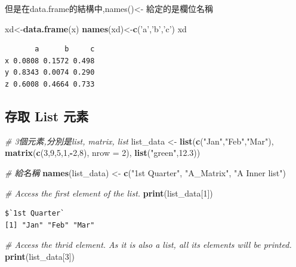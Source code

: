 \documentclass[]{book}
\newenvironment{Shaded}{\begin{snugshade}}{\end{snugshade}}
\newcommand{\CommentTok}[1]{\textcolor[rgb]{0.56,0.35,0.01}{\textit{#1}}}
\newcommand{\DataTypeTok}[1]{\textcolor[rgb]{0.13,0.29,0.53}{#1}}
\newcommand{\DecValTok}[1]{\textcolor[rgb]{0.00,0.00,0.81}{#1}}
\newcommand{\FloatTok}[1]{\textcolor[rgb]{0.00,0.00,0.81}{#1}}
\newcommand{\KeywordTok}[1]{\textcolor[rgb]{0.13,0.29,0.53}{\textbf{#1}}}
\newcommand{\NormalTok}[1]{#1}
\newcommand{\OperatorTok}[1]{\textcolor[rgb]{0.81,0.36,0.00}{\textbf{#1}}}
\newcommand{\StringTok}[1]{\textcolor[rgb]{0.31,0.60,0.02}{#1}}
\theoremstyle{definition}
\theoremstyle{definition}
\theoremstyle{definition}
\theoremstyle{remark}
\begin{document}
但是在data.frame的結構中,names()\textless{}- 給定的是欄位名稱

\begin{Shaded}
\begin{Highlighting}[]
\NormalTok{xd<-}\KeywordTok{data.frame}\NormalTok{(x)}
\KeywordTok{names}\NormalTok{(xd)<-}\KeywordTok{c}\NormalTok{(}\StringTok{'a'}\NormalTok{,}\StringTok{'b'}\NormalTok{,}\StringTok{'c'}\NormalTok{)}
\NormalTok{xd}
\end{Highlighting}
\end{Shaded}

\begin{verbatim}
       a      b     c
x 0.0808 0.1572 0.498
y 0.8343 0.0074 0.290
z 0.6008 0.4664 0.733
\end{verbatim}

\hypertarget{-list-}{%
\subsection{存取 List 元素}\label{-list-}}

\begin{Shaded}
\begin{Highlighting}[]
\CommentTok{# 3個元素,分別是list, matrix, list}
\NormalTok{list_data <-}\StringTok{ }\KeywordTok{list}\NormalTok{(}\KeywordTok{c}\NormalTok{(}\StringTok{"Jan"}\NormalTok{,}\StringTok{"Feb"}\NormalTok{,}\StringTok{"Mar"}\NormalTok{), }\KeywordTok{matrix}\NormalTok{(}\KeywordTok{c}\NormalTok{(}\DecValTok{3}\NormalTok{,}\DecValTok{9}\NormalTok{,}\DecValTok{5}\NormalTok{,}\DecValTok{1}\NormalTok{,}\OperatorTok{-}\DecValTok{2}\NormalTok{,}\DecValTok{8}\NormalTok{), }\DataTypeTok{nrow =} \DecValTok{2}\NormalTok{),}
   \KeywordTok{list}\NormalTok{(}\StringTok{"green"}\NormalTok{,}\FloatTok{12.3}\NormalTok{))}

\CommentTok{# 給名稱}
\KeywordTok{names}\NormalTok{(list_data) <-}\StringTok{ }\KeywordTok{c}\NormalTok{(}\StringTok{"1st Quarter"}\NormalTok{, }\StringTok{"A_Matrix"}\NormalTok{, }\StringTok{"A Inner list"}\NormalTok{)}

\CommentTok{# Access the first element of the list.}
\KeywordTok{print}\NormalTok{(list_data[}\DecValTok{1}\NormalTok{])}
\end{Highlighting}
\end{Shaded}

\begin{verbatim}
$`1st Quarter`
[1] "Jan" "Feb" "Mar"
\end{verbatim}

\begin{Shaded}
\begin{Highlighting}[]
\CommentTok{# Access the thrid element. As it is also a list, all its elements will be printed.}
\KeywordTok{print}\NormalTok{(list_data[}\DecValTok{3}\NormalTok{])}
\end{Highlighting}
\end{Shaded}
\end{document}
